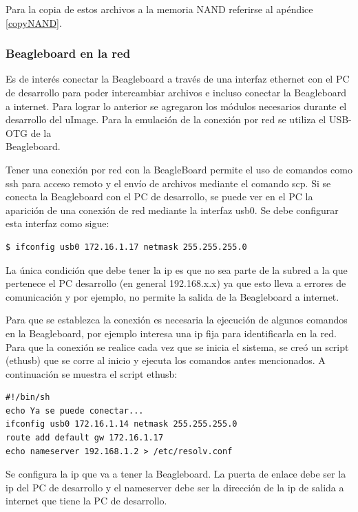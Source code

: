 \bigskip
Para la copia de estos archivos a la memoria NAND referirse al apéndice \ref{copyNAND}.

\subsubsection{Beagleboard en la red}

Es de interés conectar la Beagleboard a través de una interfaz ethernet con el PC de desarrollo para poder intercambiar archivos e incluso conectar la Beagleboard a internet. Para lograr lo anterior se agregaron los módulos necesarios durante el desarrollo del uImage. Para la emulación de la conexión por red se utiliza el USB-OTG de la \\
Beagleboard.

\bigskip
{}

\bigskip
Tener una conexión por red con la BeagleBoard permite el uso de comandos como ssh para acceso remoto y el envío de archivos mediante el comando scp. 
Si se conecta la Beagleboard con el PC de desarrollo, se puede ver en el PC la aparición de una conexión de red mediante la interfaz usb0. Se debe configurar esta interfaz como sigue:

\begin{verbatim}
$ ifconfig usb0 172.16.1.17 netmask 255.255.255.0
\end{verbatim}

La única condición que debe tener la ip es que no sea parte de la subred a la que pertenece el PC desarrollo (en general 192.168.x.x) ya que esto lleva a errores de comunicación y por ejemplo, no permite la salida de la Beagleboard a internet.

\bigskip
Para que se establezca la conexión es necesaria la ejecución de algunos comandos en la Beagleboard, por ejemplo interesa una ip fija para identificarla en la red. Para que la conexión se realice cada vez que se inicia el sistema, se creó un script (ethusb) que se corre al inicio y ejecuta los comandos antes mencionados.
A continuación se muestra el script ethusb:

\begin{verbatim}
#!/bin/sh 
echo Ya se puede conectar... 
ifconfig usb0 172.16.1.14 netmask 255.255.255.0 
route add default gw 172.16.1.17 
echo nameserver 192.168.1.2 > /etc/resolv.conf 
\end{verbatim}

Se configura la ip que va a tener la Beagleboard. La puerta de enlace debe ser la ip del PC de desarrollo y el nameserver debe ser la dirección de la ip de salida a internet que tiene la PC de desarrollo.

